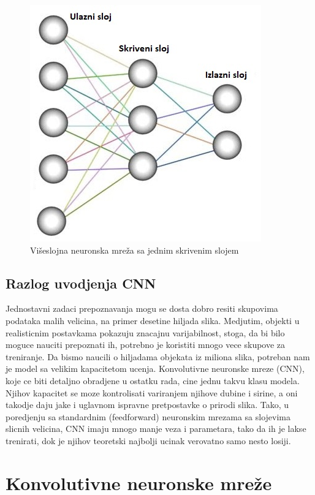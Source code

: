 \documentclass[a4paper]{article}
\begin{document}
\begin{figure}[h!]
\begin{center}
\includegraphics[scale=1]{neural_network_layers.jpeg}
\end{center}
\caption{Višeslojna neuronska mreža sa jednim skrivenim slojem}
\label{fig:neural_network_layers}
\end{figure}


\subsection{Razlog uvodjenja CNN}
Jednostavni zadaci prepoznavanja mogu se dosta dobro resiti skupovima podataka malih velicina, na primer desetine hiljada slika. Medjutim, objekti u realisticnim postavkama pokazuju znacajnu varijabilnost, stoga, da bi bilo moguce nauciti prepoznati ih, potrebno je koristiti mnogo vece skupove za treniranje. Da bismo naucili o hiljadama objekata iz miliona slika, potreban nam je model sa velikim kapacitetom ucenja. Konvolutivne neuronske mreze (CNN), koje ce biti detaljno obradjene u ostatku rada, cine jednu takvu klasu modela. Njihov kapacitet se moze kontrolisati variranjem njihove dubine i sirine, a oni takodje daju jake i uglavnom ispravne pretpostavke o prirodi slika. Tako, u poredjenju sa standardnim (feedforward) neuronskim mrezama sa slojevima slicnih velicina, CNN imaju mnogo manje veza i parametara, tako da ih je lakse trenirati, dok je njihov teoretski najbolji ucinak verovatno samo nesto losiji.


\section{Konvolutivne neuronske mreže}	
\label{sec:podnaslov3}
\end{document}
